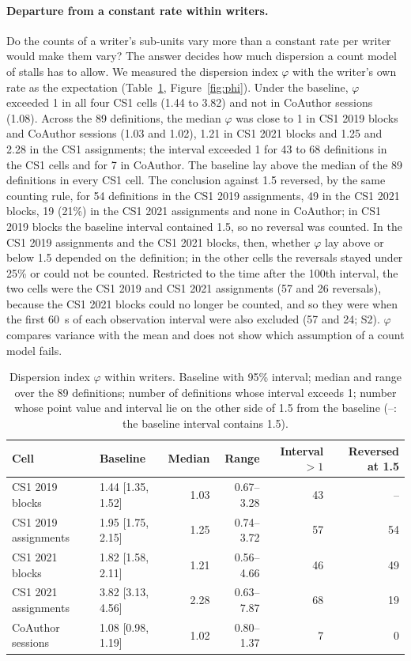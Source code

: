 \paragraph{Departure from a constant rate within writers.}
\label{sec:res-phi}
Do the counts of a writer's sub-units vary more than a constant rate per writer would make them vary? The answer
decides how much dispersion a count model of stalls has to allow. We measured the dispersion index $\varphi$ with the writer's own rate as the expectation (Table~\ref{tab:phi},
Figure~\ref{fig:phi}). Under the baseline, $\varphi$ exceeded 1 in all four CS1 cells (1.44 to 3.82) and not in
CoAuthor sessions (1.08). Across the 89 definitions, the median $\varphi$ was close to 1 in CS1 2019 blocks and CoAuthor
sessions (1.03 and 1.02), 1.21 in CS1 2021 blocks and 1.25 and 2.28 in the CS1 assignments; the interval exceeded 1 for
43 to 68 definitions in the CS1 cells and for 7 in CoAuthor. The baseline lay above the median of the 89 definitions in
every CS1 cell. The conclusion against 1.5 reversed, by the same counting rule, for 54 definitions in the CS1 2019
assignments, 49 in the CS1 2021 blocks, 19 (21\%) in the CS1 2021 assignments and none in CoAuthor; in CS1 2019 blocks
the baseline interval contained 1.5, so no reversal was counted. In the
CS1 2019 assignments and the CS1 2021 blocks, then, whether $\varphi$ lay above or below 1.5 depended on the definition;
in the other cells the reversals stayed under 25\% or could not be counted. Restricted to the time after the 100th
interval, the two cells were the CS1 2019 and CS1 2021 assignments (57 and 26 reversals), because the CS1 2021 blocks
could no longer be counted, and so they were when the first 60~s of each observation interval were also excluded
(57 and 24; S2). $\varphi$ compares variance with the mean
and does not show which assumption of a count model fails.

\begin{table}[t]
\centering\footnotesize
\caption{Dispersion index $\varphi$ within writers. Baseline with 95\% interval; median and range over the 89
definitions; number of definitions whose interval exceeds 1; number whose point value and interval lie on the other
side of 1.5 from the baseline (--: the baseline interval contains 1.5).}
\label{tab:phi}
\begin{tabular}{@{}l l r r r r@{}}
\toprule
Cell & Baseline & Median & Range & Interval $> 1$ & Reversed at 1.5 \\
\midrule
CS1 2019 blocks & 1.44 [1.35, 1.52] & 1.03 & 0.67--3.28 & 43 & -- \\
CS1 2019 assignments & 1.95 [1.75, 2.15] & 1.25 & 0.74--3.72 & 57 & 54 \\
CS1 2021 blocks & 1.82 [1.58, 2.11] & 1.21 & 0.56--4.66 & 46 & 49 \\
CS1 2021 assignments & 3.82 [3.13, 4.56] & 2.28 & 0.63--7.87 & 68 & 19 \\
CoAuthor sessions & 1.08 [0.98, 1.19] & 1.02 & 0.80--1.37 & 7 & 0 \\
\bottomrule
\end{tabular}
\end{table}

